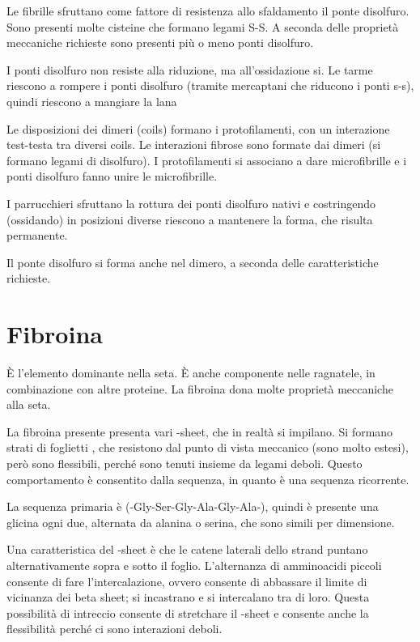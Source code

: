 Le fibrille sfruttano come fattore di resistenza allo sfaldamento il
ponte disolfuro. Sono presenti molte cisteine che formano legami S-S. A
seconda delle proprietà meccaniche richieste sono presenti più o meno
ponti disolfuro.

I ponti disolfuro non resiste alla riduzione, ma all'ossidazione si. Le tarme riescono
a rompere i ponti disolfuro (tramite mercaptani che riducono i ponti
s-s), quindi riescono a mangiare la lana

Le disposizioni dei dimeri (coils) formano i protofilamenti, con un
interazione test\alpha-testa tra diversi coils. Le interazioni fibrose sono
formate dai dimeri (si formano legami di disolfuro).
I protofilamenti si associano a dare microfibrille e i ponti disolfuro fanno unire le microfibrille.


I parrucchieri sfruttano la rottura dei ponti disolfuro nativi e
costringendo (ossidando) in posizioni diverse riescono a mantenere la
forma, che risulta permanente.


Il ponte disolfuro si forma anche nel dimero, a seconda delle
caratteristiche richieste.

\section{Fibroina}

È l'elemento dominante nella seta. È anche componente nelle ragnatele,
in combinazione con altre proteine.
La fibroina dona molte proprietà meccaniche alla seta.

La fibroina presente presenta vari \beta-sheet, che in realtà si impilano.
Si formano strati di foglietti \beta, che resistono dal punto di vista
meccanico (sono molto estesi), però sono flessibili, perché sono tenuti
insieme da legami deboli.
Questo comportamento è consentito dalla sequenza, in quanto è una sequenza ricorrente.


La sequenza primaria è (-Gly-Ser-Gly-Ala-Gly-Ala-), quindi è presente una glicina ogni due, alternata da alanina o serina, che sono simili per dimensione.

Una caratteristica del \beta-sheet è che le catene laterali dello strand
puntano alternativamente sopra e sotto il foglio.
L'alternanza di amminoacidi piccoli consente di fare l'intercalazione,
ovvero consente di abbassare il limite di vicinanza dei beta sheet; si
incastrano e si intercalano tra di loro.
Questa possibilità di intreccio consente di stretchare il \beta-sheet e
consente anche la flessibilità perché ci sono interazioni deboli.

